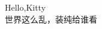\documentclass[12pt,a4paper]{article}
\begin{document}
{\noindent Hello,Kitty \\}
世界这么乱，装纯给谁看
\end{document}
